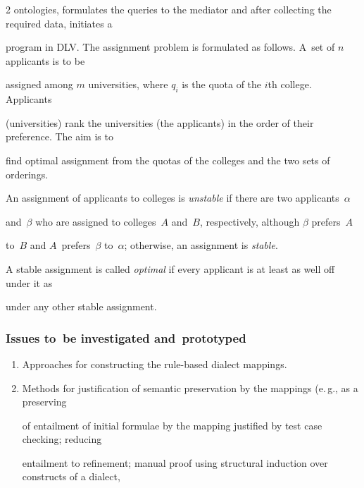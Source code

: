 \begin{multicols}{2}
ontologies, formulates the queries to the mediator and after collecting the required data, initiates a 


program in DLV. The assignment problem is formulated as follows. A~set of $n$ applicants is to be 


assigned among $m$ universities, where $q_i$ is the quota of the $i$th college. Applicants 


(universities) rank the universities (the applicants) in the order of their preference. The aim is to 


find optimal assignment from the quotas of the colleges and the two sets of orderings. 





An assignment of applicants to colleges is \textit{unstable} if there are two applicants~$\alpha$ 


and~$\beta$ who are assigned to colleges~$A$ and~$B$, respectively, although $\beta$ prefers~$A$ 


to~$B$ and $A$~prefers~$\beta$ to~$\alpha$; otherwise, an assignment is \textit{stable}.





A stable assignment is called \textit{optimal} if every applicant is at least as well off under it as 


under any other stable assignment. 





\subsubsection{Issues to~be investigated and~prototyped}





\noindent


\begin{enumerate}[1.]


\item Approaches for constructing the rule-based dialect mappings.


\item Methods for justification of semantic preservation by the mappings (e.\,g., as a preserving 


of entailment of initial formulae by the mapping justified by test case checking; reducing 


entailment to refinement; manual proof using structural induction over constructs of a dialect, 



\end{enumerate}
\end{multicols}
